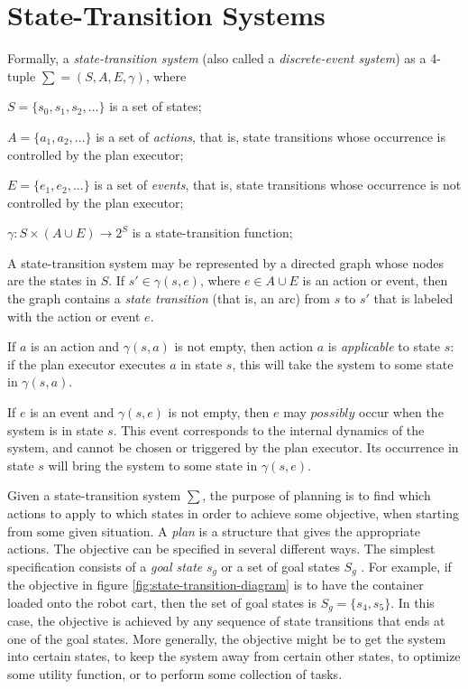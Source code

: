 \section{State-Transition Systems}
Formally, a \textit{state-transition system} (also called a
\textit{discrete-event system}) as a 4-tuple $\sum = (S, A, E, \gamma)$, where

\begin{sspara}
$S=\{s_0, s_1, s_2, ...\}$ is a set of states;

$A=\{a_1, a_2, ...\}$ is a set of \textit{actions}, that is, state transitions
whose occurrence is controlled by the plan executor;

$E=\{e_1, e_2, ...\}$ is a set of \textit{events}, that is, state transitions
whose occurrence is not controlled by the plan executor;

$\gamma:S \times (A \cup E) \rightarrow 2^S$ is a state-transition function;
\end{sspara}

A state-transition system may be represented by a directed graph whose nodes are
the states in $S$. If $s' \in \gamma (s, e)$, where $e \in A \cup E$ is an
action or event, then the graph contains a \textit{state transition} (that is,
an arc) from $s$ to $s'$ that is labeled with the action or event $e$.

\begin{sspara}
  If $a$ is an action and $\gamma(s, a)$ is not empty, then action $a$ is
  \textit{applicable} to state $s$: if the plan executor executes $a$ in state
  $s$, this will take the system to some state in $\gamma(s, a)$.

  If $e$ is an event and $\gamma(s, e)$ is not empty, then $e$ may $possibly$
  occur when the system is in state $s$. This event corresponds to the internal
  dynamics of the system, and cannot be chosen or triggered by the plan
  executor. Its occurrence in state $s$ will bring the system to some state in
  $\gamma(s, e)$.
\end{sspara}

Given a state-transition system $\sum$, the purpose of planning is to find which
actions to apply to which states in order to achieve some objective, when
starting from some given situation. A \textit{plan} is a structure that gives
the appropriate actions. The objective can be specified in several different
ways. The simplest specification consists of a \textit{goal state} $s_g$ or a
set of goal states $S_g$ . For example, if the objective in figure
\ref{fig:state-transition-diagram} is to have the container loaded onto the
robot cart, then the set of goal states is $S_g = \{s_4, s_5\}$. In this case, the
objective is achieved by any sequence of state transitions that ends at one of
the goal states. More generally, the objective might be to get the system into
certain states, to keep the system away from certain other states, to optimize
some utility function, or to perform some collection of tasks.

